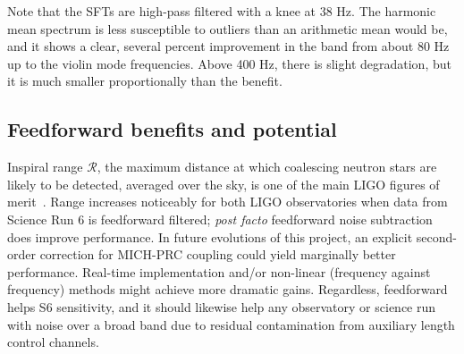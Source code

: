 Note that the SFTs are high-pass filtered with a knee at 38 Hz. The harmonic mean spectrum is less susceptible to outliers than an arithmetic mean would be, and it shows a clear, several percent improvement in the band from about 80 Hz up to the violin mode frequencies. Above 400 Hz, there is slight degradation, but it is much smaller proportionally than the benefit. 

        \subsection{Feedforward benefits and potential}
        \label{benefits}

Inspiral range $\mathcal{R}$, the maximum distance at which coalescing neutron stars are likely to be detected, averaged over the sky, is one of the main LIGO figures of merit~\cite{FinnInspiral1993}. Range increases noticeably for both LIGO observatories when data from Science Run 6 is feedforward filtered; \textit{post facto} feedforward noise subtraction does improve performance. In future evolutions of this project, an explicit second-order correction for MICH-PRC coupling could yield marginally better performance. Real-time implementation and/or non-linear (frequency against frequency) methods might achieve more dramatic gains. Regardless, feedforward helps S6 sensitivity, and it should likewise help any observatory or science run with noise over a broad band due to residual contamination from auxiliary length control channels.

